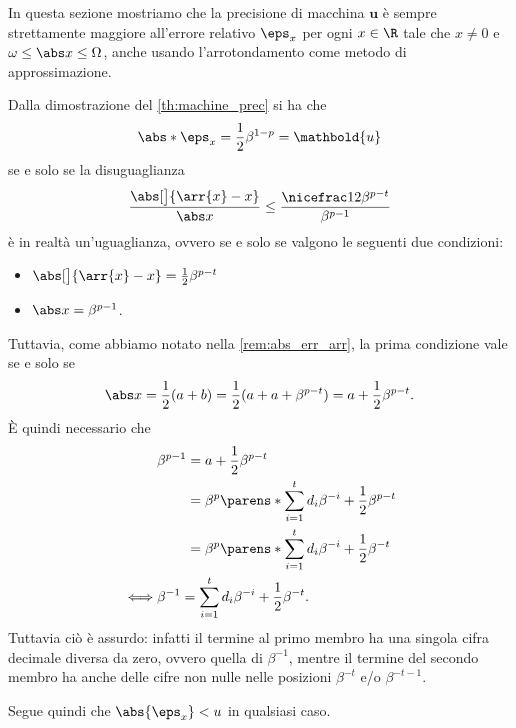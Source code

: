 In questa sezione mostriamo che la precisione di macchina $\mathbold{u}$ è sempre strettamente maggiore all'errore relativo $\eps_x$ per ogni $x \in \R$ tale che $x \neq 0$ e $\omega \leq \abs x \leq \Omega$, anche usando l'arrotondamento come metodo di approssimazione.

Dalla dimostrazione del \autoref{th:machine_prec} si ha che \[
    \abs*{\eps_x} = \frac12\beta^{1-p} = \mathbold{u}
\] se e solo se la disuguaglianza \[
    \frac{\abs[\big]{\arr{x} - x}}{\abs x} 
    \leq \frac{\nicefrac12\beta^{p-t}}{\beta^{p-1}}
\] è in realtà un'uguaglianza, ovvero se e solo se valgono le seguenti due condizioni:
\begin{itemize}
    \item $\abs[\big]{\arr{x} - x} = \frac12\beta^{p-t}$
    \item $\abs x = \beta^{p-1}$.
\end{itemize}
Tuttavia, come abbiamo notato nella \autoref{rem:abs_err_arr}, la prima condizione vale se e solo se \[
    \abs x = \frac12(a+b) = \frac12(a + a + \beta^{p-t}) = a + \frac12\beta^{p-t}.
\] È quindi necessario che \begin{align*}
    &\beta^{p-1} 
        \begin{aligned}[t] 
            &= a + \frac12\beta^{p-t} \\
            &= \beta^p \parens*{\sum_{i=1}^t d_i\beta^{-i}} + \frac12\beta^{p-t} \\
            &= \beta^p \parens*{\sum_{i=1}^t d_i\beta^{-i} + \frac12\beta^{-t}}
        \end{aligned} \\
    \iff &\beta^{-1} = \sum_{i=1}^t d_i\beta^{-i} + \frac12\beta^{-t}.
\end{align*} Tuttavia ciò è assurdo: infatti il termine al primo membro ha una singola cifra decimale diversa da zero, ovvero quella di $\beta^{-1}$, mentre il termine del secondo membro ha anche delle cifre non nulle nelle posizioni $\beta^{-t}$ e/o $\beta^{-t-1}$.  

Segue quindi che $\abs{\eps_x} < u$ in qualsiasi caso.